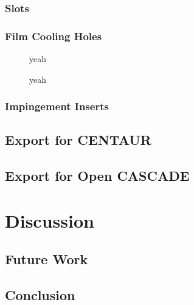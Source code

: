 \documentclass[a4paper, 11pt]{report}
\theoremstyle{definition}
\begin{document}
\subsection{Slots}
\subsection{Film Cooling Holes}
\begin{figure}[H]
	\centering
	
	\caption{yeah}
\end{figure}
\begin{figure}[H]
	\centering
	
	\caption{yeah}
\end{figure}


\subsection{Impingement Inserts}
\section{Export for CENTAUR}
\section{Export for Open CASCADE}

\chapter{Discussion}
\section{Future Work}
\section{Conclusion}
\cite{Piegl1997}

\printbibliography[heading=bibnumbered, title=References]
\end{document}
